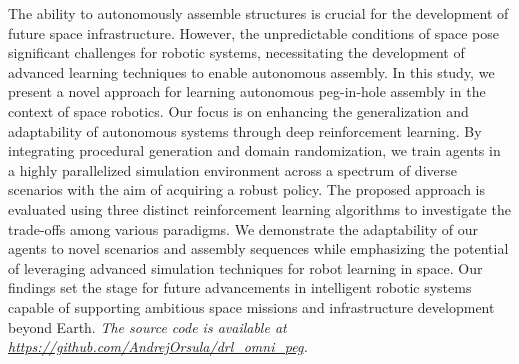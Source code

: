 The ability to autonomously assemble structures is crucial for the development of future space infrastructure. However, the unpredictable conditions of space pose significant challenges for robotic systems, necessitating the development of advanced learning techniques to enable autonomous assembly. In this study, we present a novel approach for learning autonomous peg-in-hole assembly in the context of space robotics. Our focus is on enhancing the generalization and adaptability of autonomous systems through deep reinforcement learning. By integrating procedural generation and domain randomization, we train agents in a highly parallelized simulation environment across a spectrum of diverse scenarios with the aim of acquiring a robust policy. The proposed approach is evaluated using three distinct reinforcement learning algorithms to investigate the trade-offs among various paradigms. We demonstrate the adaptability of our agents to novel scenarios and assembly sequences while emphasizing the potential of leveraging advanced simulation techniques for robot learning in space. Our findings set the stage for future advancements in intelligent robotic systems capable of supporting ambitious space missions and infrastructure development beyond Earth.
\textit{The source code is available at \href{https://github.com/AndrejOrsula/drl_omni_peg}{https://github.com/AndrejOrsula/drl\_omni\_peg}.}
